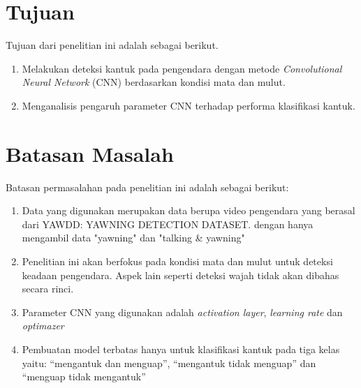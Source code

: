 \section{Tujuan}
Tujuan dari penelitian ini adalah sebagai berikut.

\begin{enumerate}

    \item Melakukan deteksi kantuk pada pengendara dengan metode \textit{Convolutional Neural Network} (CNN) berdasarkan kondisi mata dan mulut.
    
    \item Menganalisis pengaruh parameter CNN terhadap performa klasifikasi kantuk.

\end{enumerate}
\section{Batasan Masalah}
Batasan permasalahan pada penelitian ini adalah sebagai berikut:
\begin{enumerate}

    \item Data yang digunakan merupakan data berupa video pengendara 
    yang berasal dari YAWDD: YAWNING DETECTION DATASET. dengan hanya
    mengambil data "yawning" dan "talking \& yawning"
    \item Penelitian ini akan berfokus pada kondisi mata dan mulut untuk deteksi keadaan pengendara. Aspek lain seperti deteksi wajah tidak akan dibahas secara rinci. 
    \item Parameter CNN yang digunakan adalah \textit{activation layer}, \textit{learning rate} dan \textit{optimazer}
    \item Pembuatan model terbatas hanya untuk klasifikasi kantuk pada tiga kelas yaitu: “mengantuk dan menguap”, “mengantuk tidak menguap” dan “menguap tidak mengantuk”

    

\end{enumerate}